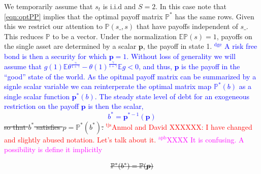 \documentclass[12pt]{article}
\newcommand{\dge}[1]{\textcolor{blue}{$^{\textrm{dge}}${#1}}}
\newcommand{\apb}[1]{\textcolor{magenta}{$^{\textrm{apb}}${#1}}}
\newcommand{\tjs}[1]{\textcolor{red}{$^{\textrm{tjs}}${#1}}}
\newcommand{\EE}{\mathbb E}
\begin{document}
We temporarily assume that $s_t$ is i.i.d and  $S=2$.  In this case note that \eqref{eqn:optPP} implies that the optimal payoff matrix $\mathbb{P}^*$ has the same rows. Given this we restrict our attention to $\mathbb{P}(s\_,s)$ that have payoffs independent of $s\_$. This reduces $\mathbb{P}$ to be  a vector.
 Under the normalization  $\mathbb{E}\mathbb{P}(s)=1$, payoffs on the single asset are  determined by a  scalar $\bm{p}$, the payoff in state 1. \dge{  A risk free bond is then a security for which $\bm{p} = 1$.  Without loss of generality we will assume that $ g(1)\EE\theta^\frac{\gamma}{1+\gamma}-\theta(1)^\frac\gamma{1+\gamma} \mathbb{E}g <0$, and thus, $\bm p$ is the payoff in the ``good'' state of the world.  As the opitmal payoff matrix can be summarized by a signle scalar variable we can reinterperate the optimal matrix map $\mathbb P^*(b)$ as a single scalar function $\bm p^*(b)$.  The steady state level of debt for an exogeneous restriction on the payoff $\bm p$ is then the scalar, 
\begin{equation}
\label{eq-ss}
 b^* =  {\bm p}^{* -1}(\bm{p})
\end{equation}}
\st{so that $b^*$ satisfies $p={\mathbb P}^*(b^*)$.}
\tjs{Anmol and David XXXXXX: I have changed and slightly abused notation. Let's talk about it.}
\apb{XXXX It is confusing. A possibility is define it implicitly }


\begin{equation}
\label{eq-ss}
\text{\st{$ \mathbb{P}^*(b^*) =  {\mathbb P}(\bm{p})$}}
\end{equation}
\end{document}
